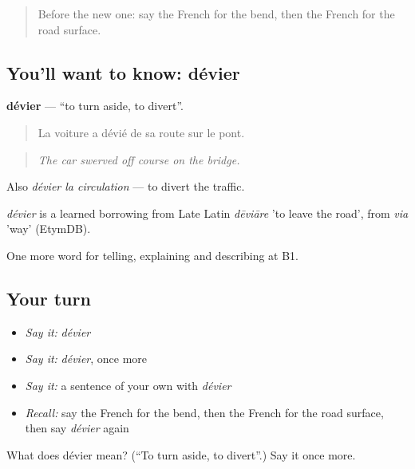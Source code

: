 \label{lesson:FR-C409-devier}



\begin{quote}
Before the new one: say the French for the bend, then the French for the road surface.
\end{quote}

\subsection*{You'll want to know: dévier}
\textbf{dévier} — \textquotedblleft{}to turn aside, to divert\textquotedblright{}.

\begin{quote}
La voiture a dévié de sa route sur le pont.
\end{quote}

\begin{quote}
\emph{The car swerved off course on the bridge.}
\end{quote}

Also \emph{dévier la circulation} — to divert the traffic.

\begin{cousinweb}
\emph{dévier} is a learned borrowing from Late Latin \emph{dēviāre} 'to leave the road', from \emph{via} 'way' (EtymDB).
\end{cousinweb}

\begin{grammarlens}[title={What you've built}]
One more word for telling, explaining and describing at B1.
\end{grammarlens}

\subsection*{Your turn}
\begin{itemize}
\raggedright
  \item \emph{Say it:} \emph{dévier}
  \item \emph{Say it:} \emph{dévier}, once more
  \item \emph{Say it:} a sentence of your own with \emph{dévier}
  \item \emph{Recall:} say the French for the bend, then the French for the road surface, then say \emph{dévier} again
\end{itemize}

\begin{tcolorbox}[breakable,colback=teal!4,colframe=teal!35!black,title={Before you move on}]
What does dévier mean? (\textquotedblleft{}To turn aside, to divert\textquotedblright{}.) Say it once more.
\end{tcolorbox}
